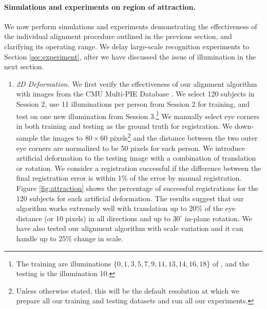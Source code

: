 \paragraph{Simulations and experiments on region of attraction.} We now perform simulations and experiments demonstrating the effectiveness of the individual alignment procedure outlined in the previous section, and clarifying its operating range. We delay large-scale recognition experiments to Section \ref{sec:experiment}, after we have discussed the issue of illumination in the next section.\vspace{0mm}
\begin{enumerate}	
\item{\em 2D Deformation.}  We first verify the effectiveness of our alignment algorithm with images from the CMU Multi-PIE Database \cite{Gross2008-FGR}. We select 120 subjects in Session 2, use 11 illuminations per person from Session 2 for training, and test on one new illumination from Session 3.\footnote{The training are illuminations $\{0, 1,3,5,7,9,11,13,14,16,18\}$ of \cite{Gross2008-FGR}, and the testing is the illumination 10. } We manually select eye corners in both training and testing as the ground truth for registration. We down-sample the images to $80\times 60$ pixels\footnote{Unless otherwise stated, this will be the default resolution at which we prepare all our training and testing datasets and run all our experiments.} and the distance between the two outer eye corners are normalized to be 50 pixels for each person. We introduce artificial deformation to the testing image with a combination of translation or rotation. We consider a registration successful if the difference between the final registration error is within 1\% of the error by manual registration.  Figure \ref{fig:attraction} shows the percentage of successful registrations for the 120 subjects for each artificial deformation. The results suggest that our algorithm works extremely well with translation up to 20\% of the eye distance (or 10 pixels) in all directions and up to $30^\circ$ in-plane rotation. We have also tested our alignment algorithm with scale variation and it can handle up to 25\% change in scale.


\end{enumerate}

